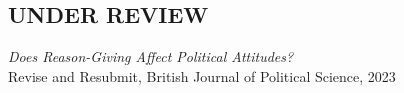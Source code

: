 \documentclass[centered]{res}
\begin{document}
\begin{resume}
\section{UNDER REVIEW} 


{\sl Does Reason-Giving Affect Political Attitudes?} \\
Revise and Resubmit, British Journal of Political Science, 2023








\end{resume}
\end{document}
